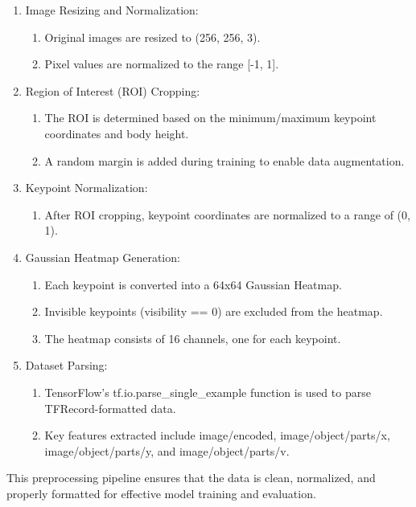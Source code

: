 \documentclass{article}
\begin{document}
\begin{enumerate}
    \item Image Resizing and Normalization:
    \begin{enumerate}
        \item Original images are resized to (256, 256, 3).
        \item Pixel values are normalized to the range [-1, 1].
    \end{enumerate}
    \item Region of Interest (ROI) Cropping:
    \begin{enumerate}
        \item The ROI is determined based on the minimum/maximum keypoint coordinates and body height.
        \item A random margin is added during training to enable data augmentation.
    \end{enumerate}
    \item Keypoint Normalization:
    \begin{enumerate}
        \item After ROI cropping, keypoint coordinates are normalized to a range of (0, 1).
    \end{enumerate}
    \item Gaussian Heatmap Generation:
    \begin{enumerate}
        \item Each keypoint is converted into a 64x64 Gaussian Heatmap.
        \item Invisible keypoints (visibility == 0) are excluded from the heatmap.
        \item The heatmap consists of 16 channels, one for each keypoint.
    \end{enumerate}
    \item Dataset Parsing:
    \begin{enumerate}
        \item TensorFlow’s tf.io.parse\_single\_example function is used to parse TFRecord-formatted data.
        \item Key features extracted include image/encoded, image/object/parts/x, image/object/parts/y, and image/object/parts/v.
    \end{enumerate}
\end{enumerate}

This preprocessing pipeline ensures that the data is clean, normalized, and properly formatted for effective model training and evaluation.
\end{document}
